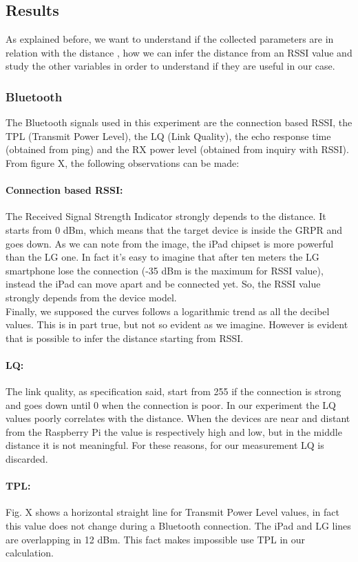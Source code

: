 \subsection{Results}
As explained before, we want to understand if the collected parameters are in relation with the distance , how we can infer the distance from an RSSI value and study the other variables in order to understand if they are useful in our case.\\
\subsubsection{Bluetooth}
The Bluetooth signals used in this experiment are the connection based RSSI, the TPL (Transmit Power Level), the LQ (Link Quality), the echo response time (obtained from ping) and the RX power level (obtained from inquiry with RSSI).\\
From figure X, the following observations can be made:
\paragraph{Connection based RSSI:} The Received Signal Strength Indicator strongly depends to the distance. It starts from 0 dBm, which means that the target device is inside the GRPR and goes down. As we can note from the image, the iPad chipset is more powerful than the LG one. In fact it's easy to imagine that after ten meters the LG smartphone lose the connection (-35 dBm is the maximum for RSSI value), instead the iPad can move apart and be connected yet. So, the RSSI value strongly depends from the device model.\\
Finally, we supposed the curves follows a logarithmic trend as all the decibel values. This is in part true, but not so evident as we imagine. However is evident that is possible to infer the distance starting from RSSI.
\paragraph{LQ:} The link quality, as specification said, start from 255 if the connection is strong and goes down until 0 when the connection is poor. In our experiment the LQ values poorly correlates with the distance. When the devices are near and distant from the Raspberry Pi the value is respectively high and low, but in the middle distance it is not meaningful. For these reasons, for our measurement LQ is discarded.
\paragraph{TPL:} 
Fig. X shows a horizontal straight line for Transmit Power Level values, in fact this value does not change during a Bluetooth connection. The iPad and LG lines are overlapping in 12 dBm. This fact makes impossible use TPL in our calculation.
